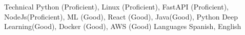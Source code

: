 
\begin{cvskills}

  \cvskill
  {Technical} %
  {Python (Proficient), Linux (Proficient), FastAPI (Proficient), NodeJs(Proficient), ML (Good), React (Good), Java(Good), Python Deep Learning(Good), Docker (Good), AWS (Good)} %
  \cvskill
  {Languages} %
  {Spanish, English} %

\end{cvskills}
